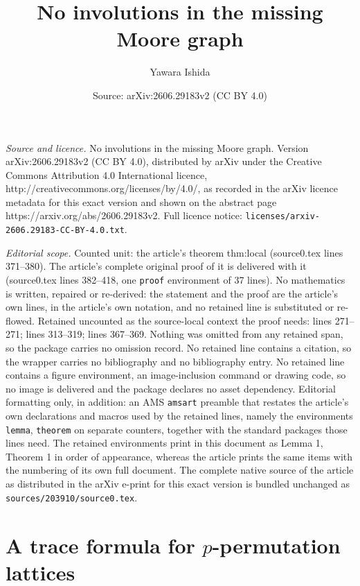 \documentclass[10pt,a4paper]{amsart}
\title{No involutions in the missing Moore graph}
\author{Yawara Ishida}
\date{Source: arXiv:2606.29183v2 (CC BY 4.0)}
\begin{document}
\maketitle

\noindent\emph{Source and licence.} No involutions in the missing Moore graph. Version arXiv:2606.29183v2 (CC BY 4.0), distributed by arXiv under the Creative Commons Attribution 4.0 International licence, http://creativecommons.org/licenses/by/4.0/, as recorded in the arXiv licence metadata for this exact version and shown on the abstract page https://arxiv.org/abs/2606.29183v2. Full licence notice: \texttt{licenses/arxiv-2606.29183-CC-BY-4.0.txt}.\par\smallskip

\noindent\textit{Editorial scope.} Counted unit: the article's theorem thm:local (source0.tex lines 371--380). The article's complete original proof of it is delivered with it (source0.tex lines 382--418, one \texttt{proof} environment of 37 lines). No mathematics is written, repaired or re-derived: the statement and the proof are the article's own lines, in the article's own notation, and no retained line is substituted or re-flowed.  Retained uncounted as the source-local context the proof needs: lines 271--271; lines 313--319; lines 367--369.  Nothing was omitted from any retained span, so the package carries no omission record.  No retained line contains a citation, so the wrapper carries no bibliography and no bibliography entry.  No retained line contains a figure environment, an image-inclusion command or drawing code, so no image is delivered and the package declares no asset dependency.  Editorial formatting only, in addition: an AMS \texttt{amsart} preamble that restates the article's own declarations and macros used by the retained lines, namely the environments \texttt{lemma}, \texttt{theorem} on separate counters, together with the standard packages those lines need.  The retained environments print in this document as Lemma 1, Theorem 1 in order of appearance, whereas the article prints the same items with the numbering of its own full document.  The complete native source of the article as distributed in the arXiv e-print for this exact version is bundled unchanged as \texttt{sources/203910/source0.tex}.
\section{\texorpdfstring{A trace formula for $p$-permutation lattices}{A trace formula for p-permutation lattices}}\label{sec:padic}
\end{document}
